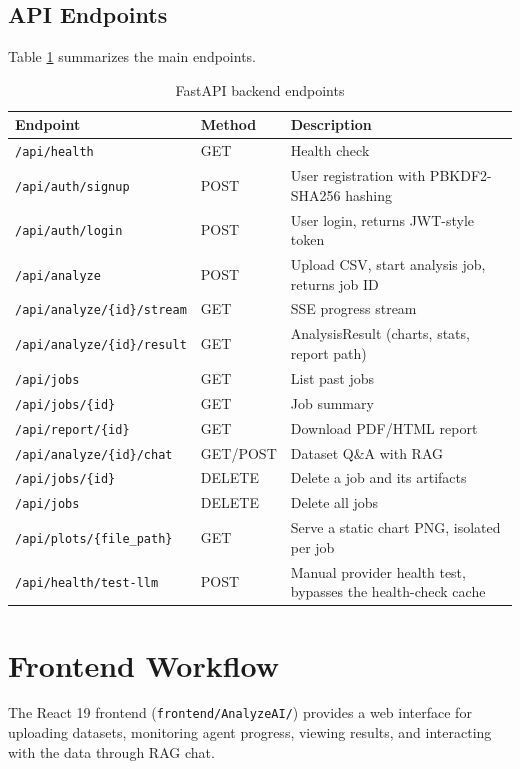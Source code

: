 \documentclass[12pt,a4paper,openany]{report}
\begin{document}
\subsection{API Endpoints}
Table \ref{tab:api-endpoints} summarizes the main endpoints.

\begin{table}[H]
\centering
\caption{FastAPI backend endpoints}
\label{tab:api-endpoints}
\begin{tabular}{p{4cm} >{\centering\arraybackslash}p{3.5cm} p{6cm}}
\hline
Endpoint & Method & Description \\
\hline
\texttt{/api/health} & GET & Health check \\
\texttt{/api/auth/signup} & POST & User registration with PBKDF2-SHA256 hashing \\
\texttt{/api/auth/login} & POST & User login, returns JWT-style token \\
\texttt{/api/analyze} & POST & Upload CSV, start analysis job, returns job ID \\
\texttt{/api/analyze/\{id\}/stream} & GET & SSE progress stream \\
\texttt{/api/analyze/\{id\}/result} & GET & AnalysisResult (charts, stats, report path) \\
\texttt{/api/jobs} & GET & List past jobs \\
\texttt{/api/jobs/\{id\}} & GET & Job summary \\
\texttt{/api/report/\{id\}} & GET & Download PDF/HTML report \\
\texttt{/api/analyze/\{id\}/chat} & GET/POST & Dataset Q\&A with RAG \\
\texttt{/api/jobs/\{id\}} & DELETE & Delete a job and its artifacts \\
\texttt{/api/jobs} & DELETE & Delete all jobs \\
\texttt{/api/plots/\{file\_path\}} & GET & Serve a static chart PNG, isolated per job \\
\texttt{/api/health/test-llm} & POST & Manual provider health test, bypasses the health-check cache \\
\hline
\end{tabular}
\end{table}

\section{Frontend Workflow}
The React 19 frontend (\texttt{frontend/AnalyzeAI/}) provides a web interface for uploading datasets, monitoring agent progress, viewing results, and interacting with the data through RAG chat.
\end{document}
